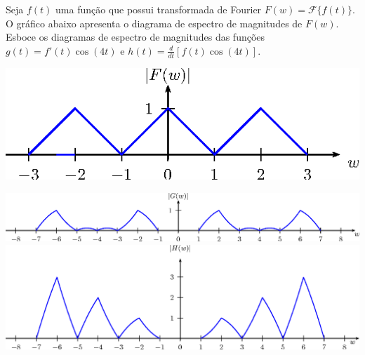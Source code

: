 \begin{exer} Seja $f(t)$ uma função que possui transformada de Fourier $F(w)=\mathcal{F}\{f(t)\}$. O gráfico abaixo apresenta o diagrama de espectro de magnitudes de $F(w)$. Esboce os diagramas de espectro de magnitudes das funções $g(t)=f'(t)\cos(4t)$ e $h(t)=\frac{d}{dt}\left[f(t)\cos(4t)\right]$.

    \begin{center}
        \includegraphics{cap_propriedades_transformada/pics/diagrama_7A}
    \end{center}
\end{exer}

\begin{resp}
    \begin{center}
    \includegraphics{cap_propriedades_transformada/pics/diagrama_7A_resp_1}\\
    \includegraphics{cap_propriedades_transformada/pics/diagrama_7A_resp_2}
    \end{center}
\end{resp}
           


